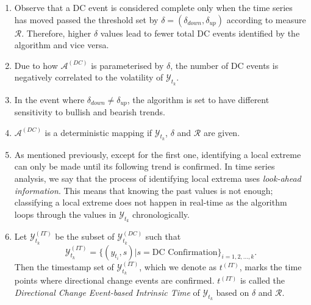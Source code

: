 \begin{enumerate}
    \item Observe that a DC event is considered complete only when the time series has moved passed the threshold set by $\delta = (\delta_{down}, \delta_{up})$ according to measure $\mathcal{R}$. Therefore, higher $\delta$ values lead to fewer total DC events identified by the algorithm and vice versa.
    \item Due to how $\mathcal{A}^{(DC)}$ is parameterised by $\delta$, the number of DC events is negatively correlated to the volatility of $\mathcal{Y}_{t_k}$.
    \item In the event where $\delta_{down} \neq \delta_{up}$, the algorithm is set to have different sensitivity to bullish and bearish trends.
    \item $\mathcal{A}^{(DC)}$ is a deterministic mapping if $\mathcal{Y}_{t_k}$, $\delta$ and $\mathcal{R}$ are given.
    \item As mentioned previously, except for the first one, identifying a local extreme can only be made until its following trend is confirmed. In time series analysis, we say that the process of identifying local extrema uses \textit{look-ahead information}. This means that knowing the past values is not enough; classifying a local extreme does not happen in real-time as the algorithm loops through the values in $\mathcal{Y}_{t_k}$ chronologically.
    \item Let $\mathcal{Y}^{(IT)}_{t_k}$ be the subset of $\mathcal{Y}^{(DC)}_{t_k}$ such that
    \begin{equation*}
        \mathcal{Y}^{(IT)}_{t_k} = \{ (y_{t_i}, s) | s = \text{DC Confirmation} \}_{i = 1, 2, \ldots, k}.
    \end{equation*}
    Then the timestamp set of $\mathcal{Y}^{(IT)}_{t_k}$, which we denote as $t^{(IT)}$, marks the time points where directional change events are confirmed. $t^{(IT)}$ is called the \textit{Directional Change Event-based Intrinsic Time} of $\mathcal{Y}_{t_k}$ based on $\delta$ and $\mathcal{R}$.
\end{enumerate}
